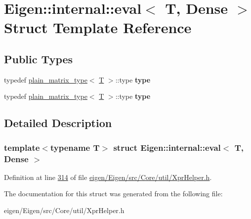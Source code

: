 \hypertarget{struct_eigen_1_1internal_1_1eval_3_01_t_00_01_dense_01_4}{}\section{Eigen\+:\+:internal\+:\+:eval$<$ T, Dense $>$ Struct Template Reference}
\label{struct_eigen_1_1internal_1_1eval_3_01_t_00_01_dense_01_4}
\subsection*{Public Types}
\begin{DoxyCompactItemize}
\item 
\mbox{\label{struct_eigen_1_1internal_1_1eval_3_01_t_00_01_dense_01_4_a3a362b3b0d46ae32ce625c952737bc2c}} 
typedef \hyperlink{struct_eigen_1_1internal_1_1plain__matrix__type}{plain\+\_\+matrix\+\_\+type}$<$ \hyperlink{group___sparse_core___module}{T} $>$\+::type {\bfseries type}
\item 
\mbox{\label{struct_eigen_1_1internal_1_1eval_3_01_t_00_01_dense_01_4_a3a362b3b0d46ae32ce625c952737bc2c}} 
typedef \hyperlink{struct_eigen_1_1internal_1_1plain__matrix__type}{plain\+\_\+matrix\+\_\+type}$<$ \hyperlink{group___sparse_core___module}{T} $>$\+::type {\bfseries type}
\end{DoxyCompactItemize}


\subsection{Detailed Description}
\subsubsection*{template$<$typename T$>$\newline
struct Eigen\+::internal\+::eval$<$ T, Dense $>$}



Definition at line \hyperlink{eigen_2_eigen_2src_2_core_2util_2_xpr_helper_8h_source_l00314}{314} of file \hyperlink{eigen_2_eigen_2src_2_core_2util_2_xpr_helper_8h_source}{eigen/\+Eigen/src/\+Core/util/\+Xpr\+Helper.\+h}.



The documentation for this struct was generated from the following file\+:\begin{DoxyCompactItemize}
\item 
eigen/\+Eigen/src/\+Core/util/\+Xpr\+Helper.\+h\end{DoxyCompactItemize}
